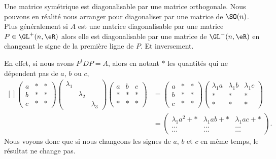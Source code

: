 \begin{remark}  \label{RemGKDZfxu}
    Une matrice symétrique est diagonalisable par une matrice orthogonale. Nous pouvons en réalité nous arranger pour diagonaliser par une matrice de \( \SO(n)\). Plus généralement si \( A\) est une matrice diagonalisable par une matrice \( P\in\GL^+(n,\eR)\) alors elle est diagonalisable par une matrice de \( \GL^-(n,\eR)\) en changeant le signe de la première ligne de \( P\). Et inversement.

    En effet, si nous avons \( P^tDP=A\), alors en notant \( *\) les quantités qui ne dépendent pas de \( a\), \( b\) ou \( c\),
    \begin{equation}
        \begin{aligned}[]
        \begin{pmatrix}
            a    &   *    &   *    \\
            b    &   *    &   *    \\
            c    &   *    &   *
        \end{pmatrix}
        \begin{pmatrix}
            \lambda_1    &       &       \\
                &   \lambda_2    &       \\
                &       &   \lambda_3
            \end{pmatrix}
            \begin{pmatrix}
                a    &   b    &   c    \\
                *    &   *    &   *    \\
                *    &   *    &   *
            \end{pmatrix}&=
        \begin{pmatrix}
            a    &   *    &   *    \\
            b    &   *    &   *    \\
            c    &   *    &   *
        \end{pmatrix}
        \begin{pmatrix}
            \lambda_1a    &   \lambda_1b    &   \lambda_1c    \\
            *    &   *    &   *    \\
            *    &   *    &   *
        \end{pmatrix}\\
        &=\begin{pmatrix}
            \lambda_1 a^2+*   &   \lambda_1ab+*    &   \lambda_1ac  +*  \\
            \ldots    &   \ldots    &   \ldots    \\
            \ldots    &   \ldots    &   \ldots
        \end{pmatrix}.
        \end{aligned}
    \end{equation}
    Nous voyons donc que si nous changeons les signes de \( a\), \( b\) et \( c\) en même temps, le résultat ne change pas.
\end{remark}
